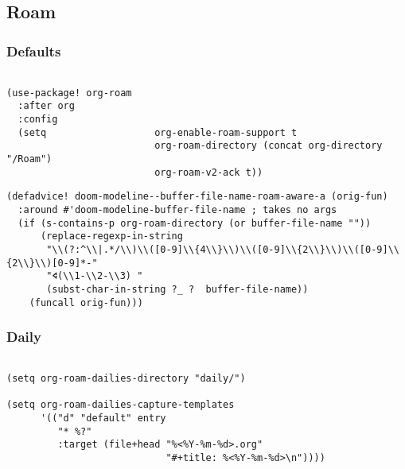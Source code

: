 \documentclass[c]{article}
\theoremstyle{plain}%
\theoremstyle{definition}
\theoremstyle{remark}
\begin{document}
\subsection{Roam}
\label{sec:org912acff}
\subsubsection{Defaults}
\label{sec:org783238e}
\begin{verbatim}

(use-package! org-roam
  :after org
  :config
  (setq                   org-enable-roam-support t
                          org-roam-directory (concat org-directory "/Roam")
                          org-roam-v2-ack t))

\end{verbatim}
\begin{verbatim}
(defadvice! doom-modeline--buffer-file-name-roam-aware-a (orig-fun)
  :around #'doom-modeline-buffer-file-name ; takes no args
  (if (s-contains-p org-roam-directory (or buffer-file-name ""))
      (replace-regexp-in-string
       "\\(?:^\\|.*/\\)\\([0-9]\\{4\\}\\)\\([0-9]\\{2\\}\\)\\([0-9]\\{2\\}\\)[0-9]*-"
       "🢔(\\1-\\2-\\3) "
       (subst-char-in-string ?_ ?  buffer-file-name))
    (funcall orig-fun)))
\end{verbatim}
\subsubsection{Daily}
\label{sec:org989103f}
\begin{verbatim}

(setq org-roam-dailies-directory "daily/")

(setq org-roam-dailies-capture-templates
      '(("d" "default" entry
         "* %?"
         :target (file+head "%<%Y-%m-%d>.org"
                            "#+title: %<%Y-%m-%d>\n"))))
\end{verbatim}
\end{document}
